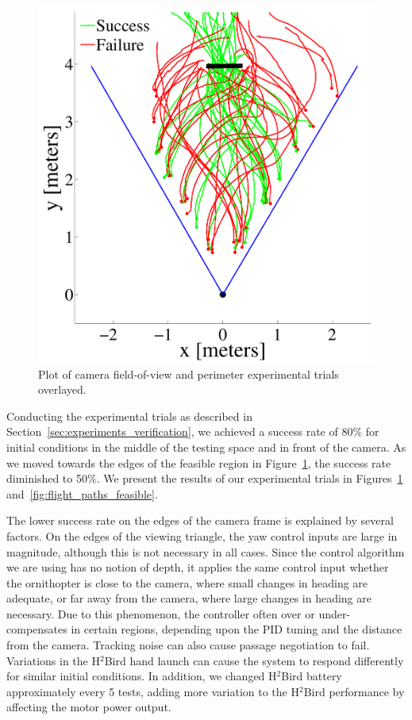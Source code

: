 \documentclass{aamas2013}
\begin{document}
\begin{figure}[tb]
\begin{minipage}[b]{0.45\linewidth}
\includegraphics[width=\textwidth]{figures/flight_paths.pdf}
\caption{Plot of camera field-of-view and perimeter experimental trials overlayed.}
\label{fig:flight_paths}
\end{minipage}
\end{figure}

Conducting the experimental trials as described in 
Section~\ref{sec:experiments_verification}, we achieved a success rate of 
80\% for initial conditions in the middle of the testing space and in front 
of the camera. As we moved towards the edges of the feasible region in 
Figure~\ref{fig:flight_paths}, the success rate diminished to 50\%. We 
present the results of our experimental trials in Figures~\ref{fig:flight_paths} 
and~\ref{fig:flight_paths_feasible}.

The lower success rate on the edges of the camera frame is explained by 
several factors. On the edges of the viewing triangle, the yaw control 
inputs are large in magnitude, although this is not necessary in all cases. 
Since the control algorithm we are using has no notion of depth, it applies 
the same control input whether the ornithopter is close to the camera, where 
small changes in heading are adequate, or far away from the camera, where 
large changes in heading are necessary. Due to this phenomenon, the 
controller often over or under-compensates in certain regions, depending 
upon the PID tuning and the distance from the camera. Tracking noise can 
also cause passage negotiation to fail. Variations in the H$^2$Bird hand 
launch can cause the system to respond differently for similar initial 
conditions. In addition, we changed H$^2$Bird battery approximately every 5 
tests, adding more variation to the H$^2$Bird performance by affecting the 
motor power output.
\end{document}
